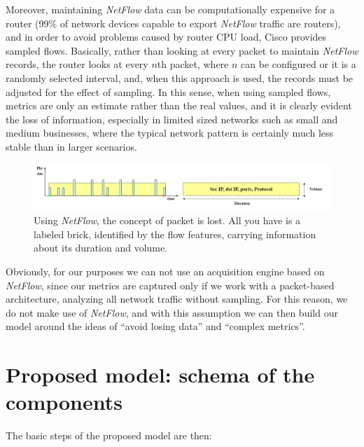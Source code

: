 \documentclass[12pt,a4paper,cucitura]{toptesi}
\begin{document}
Moreover, maintaining \emph{NetFlow} data can be computationally expensive for a router (99\% of network devices capable to export \emph{NetFlow} traffic are routers), and in order to avoid problems caused by router CPU load, Cisco provides sampled flows.
Basically, rather than looking at every packet to maintain \emph{NetFlow} records, the router looks at every $n$th packet, where $n$ can be configured or it is a randomly selected interval, and, when this approach is used, the records must be adjusted for the effect of sampling.
In this sense, when using sampled flows, metrics are only an estimate rather than the real values, and it is clearly evident the loss of information, especially in limited sized networks such as small and medium businesses, where the typical network pattern is certainly much less stable than in larger scenarios.

\begin{figure}
\centering
\includegraphics[width=\textwidth]{netflow.png}
\caption[\emph{NetFlow}]{Using \emph{NetFlow}, the concept of packet is lost. All you have is a labeled brick, identified by the flow features, carrying information about its duration and volume.}
\end{figure}

Obviously, for our purposes we can not use an acquisition engine based on \emph{NetFlow}, since our metrics are captured only if we work with a packet-based architecture, analyzing all network traffic without sampling. For this reason, we do not make use of \emph{NetFlow}, and with this assumption we can then build our model around the ideas of ``avoid losing data'' and ``complex metrics''.

\section{Proposed model: schema of the components}

The basic steps of the proposed model are then: 
\end{document}
